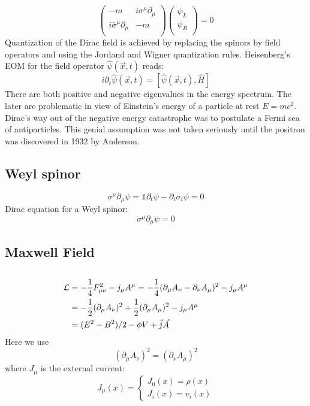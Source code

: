 \[
    \begin{pmatrix}
	-m  & i\sigma^\mu\partial_\mu	\\
	i\bar{\sigma}^\mu\partial_\mu	& -m	\\
    \end{pmatrix}
    \begin{pmatrix}
	\psi_L	\\
	\psi_R	\\
    \end{pmatrix} = 0
\]
Quantization of the Dirac field is achieved by replacing the spinors by
field operators and using the Jordand and Wigner quantization rules.
Heisenberg's EOM for the field operator $\hat{\psi}(\vec{x}, t)$
reads:
$$ i\partial_{t}\hat{\psi}(\vec{x}, t) = [
    \hat{\psi}(\vec{x}, t), \hat{H}]$$
There are both positive and negative eigenvalues in the energy spectrum. The
later are problematic in view of Einstein’s energy of a particle at rest 
$ E = mc^2 $. Dirac’s way out of the negative energy catastrophe was to 
postulate a Fermi sea of antiparticles. This genial assumption was not 
taken seriously until the positron was discovered in 1932 by Anderson.

\subsection{Weyl spinor}
\[  \sigma^\mu\partial_\mu\psi=\mathds{1}\partial_t\psi-\partial_i\sigma_i\psi=0    \]
Dirac equation for a Weyl spinor:
\[  \sigma^\mu\partial_\mu\psi=0    \]

\subsection{Maxwell Field}
\begin{equation}
    \label{Maxwell Eqn}
\end{equation}

\[ 
\begin{aligned}
    \mathcal{L} &= -\frac{1}{4}F^2_{\mu\nu} - j_{\mu}A^{\mu} 
    =-\frac{1}{4}(\partial_{\mu}A_\nu-\partial_{\nu}A_\mu)^2-j_{\mu}A^{\mu}\\
    &=-\frac{1}{2}(\partial_{\mu}A_\nu)^2+\frac{1}{2}(\partial_{\mu}A_\mu)^2-j_{\mu}A^{\mu}\\
    &=(E^2 - B^2)/2 - \phi V + \vec{j}\vec{A} 
\end{aligned}
    \]
Here we use
\[
    (\partial_{\mu}A_\nu)^2=(\partial_{\nu}A_\mu)^2
    \]
where $J_\mu$ is the external current:
\[ J_\mu(x) = \left\{ 
\begin{aligned}
    J_0(x) = \rho(x) \\
    J_i(x) = v_i(x)
\end{aligned}
\right.\]

